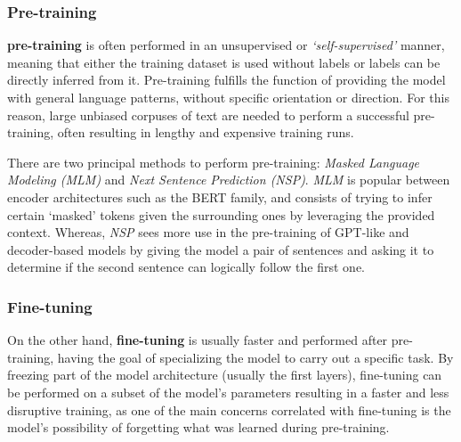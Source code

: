 \subsubsection*{Pre-training}

\textbf{pre-training} is often performed in an unsupervised or \emph{`self-supervised'} manner, meaning that either the training dataset is used without labels or labels can be directly inferred from it.
Pre-training fulfills the function of providing the model with general language patterns, without specific orientation or direction.
For this reason, large unbiased corpuses of text are needed to perform a successful pre-training, often resulting in lengthy and expensive training runs.

There are two principal methods to perform pre-training: \emph{Masked Language Modeling (MLM)} and \emph{Next Sentence Prediction (NSP)}.
\emph{MLM} is popular between encoder architectures such as the BERT family, and consists of trying to infer certain `masked' tokens given the surrounding ones by leveraging the provided context.
Whereas, \emph{NSP} sees more use in the pre-training of GPT-like and decoder-based models by giving the model a pair of sentences and asking it to determine if the second sentence can logically follow the first one.

\subsubsection*{Fine-tuning}

On the other hand, \textbf{fine-tuning} is usually faster and performed after pre-training, having the goal of specializing the model to carry out a specific task.
By freezing part of the model architecture (usually the first layers), fine-tuning can be performed on a subset of the model's parameters resulting in a faster and less disruptive training, as one of the main concerns correlated with fine-tuning is the model's possibility of forgetting what was learned during pre-training.